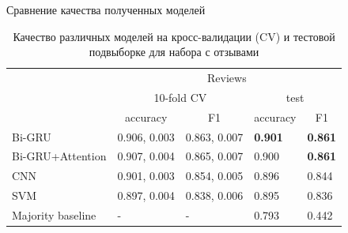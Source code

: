 \documentclass{beamer}
\begin{document}
\begin{frame}{Сравнение качества полученных моделей}
\begin{table}[]
	\centering
	\caption{Качество различных моделей на кросс-валидации (CV) и тестовой подвыборке для набора с отзывами}
	\begin{tabular}{l|l|l|l|l|}
		\cline{2-5}
		& \multicolumn{4}{c|}{Reviews}                                                                                      \\ \cline{2-5} 
		& \multicolumn{2}{c|}{10-fold CV}                         & \multicolumn{2}{c|}{test}                               \\ \cline{2-5} 
		& \multicolumn{1}{c|}{accuracy} & \multicolumn{1}{c|}{F1} & \multicolumn{1}{c|}{accuracy} & \multicolumn{1}{c|}{F1} \\ \hline
		\multicolumn{1}{|l|}{Bi-GRU}           & 0.906, 0.003                  & 0.863, 0.007            & \textbf{0.901}                         & \textbf{0.861}                   \\ \hline
		\multicolumn{1}{|l|}{Bi-GRU+Attention} & 0.907, 0.004                  & 0.865, 0.007            & 0.900                         & \textbf{0.861}                   \\ \hline
		\multicolumn{1}{|l|}{CNN}              & 0.901, 0.003                  & 0.854, 0.005            & 0.896                         & 0.844                   \\ \hline
		\multicolumn{1}{|l|}{SVM}              & 0.897, 0.004                  & 0.838, 0.006            & 0.895                         & 0.836                   \\ \hline
		\multicolumn{1}{|l|}{Majority baseline}              & -                  & -            & 0.793                         & 0.442                   \\ \hline
	\end{tabular}
\end{table}

\end{frame}
\end{document}
